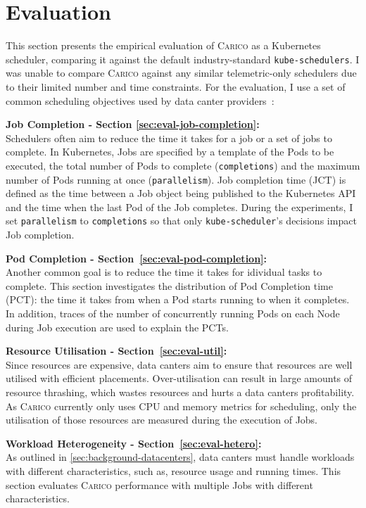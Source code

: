 \chapter{Evaluation}

This section presents the empirical evaluation of \textsc{Carico} as a
Kubernetes scheduler, comparing it against the default industry-standard
\texttt{kube-schedulers}. I was unable to compare \textsc{Carico} against any
similar telemetric-only schedulers due to their limited number and time
constraints. For the evaluation, I use a set of common scheduling objectives
used by data canter providers~\cite{thesis}:

\textbf{Job Completion - Section \ref{sec:eval-job-completion}:}\\
Schedulers often aim to reduce the time it takes for a job or a set of jobs to
complete. In Kubernetes, Jobs are specified by a template of the Pods to be
executed, the total number of Pods to complete (\texttt{completions}) and the
maximum number of Pods running at once (\texttt{parallelism}). Job completion
time (JCT) is defined as the time between a Job object being published to the
Kubernetes API and the time when the last Pod of the Job completes. During the
experiments, I set \texttt{parallelism} to \texttt{completions} so that only
\texttt{kube-scheduler}'s decisions impact Job completion.

\textbf{Pod Completion - Section~\ref{sec:eval-pod-completion}:}\\
Another common goal is to reduce the time it takes for idividual tasks to complete.
This section investigates the distribution of Pod Completion time (PCT): the
time it takes from when a Pod starts running to when it completes. In addition,
traces of the number of concurrently running Pods on each Node during Job
execution are used to explain the PCTs.

\textbf{Resource Utilisation - Section~\ref{sec:eval-util}:}\\
Since resources are expensive, data canters aim to ensure that resources are
well utilised with efficient placements. Over-utilisation can result in large
amounts of resource thrashing, which wastes resources and hurts a data canters
profitability. As \textsc{Carico} currently only uses CPU and memory metrics
for scheduling, only the utilisation of those resources are measured during the
execution of Jobs.

\textbf{Workload Heterogeneity - Section~\ref{sec:eval-hetero}:}\\
As outlined in \ref{sec:background-datacenters}, data canters must handle
workloads with different characteristics, such as, resource usage and running
times. This section evaluates \textsc{Carico} performance with multiple Jobs
with different characteristics.

